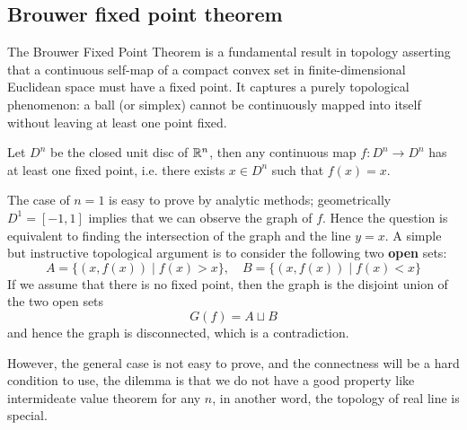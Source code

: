 \subsection{Brouwer fixed point theorem}
The Brouwer Fixed Point Theorem is a fundamental result in topology asserting that a continuous self-map of a compact convex set in finite-dimensional Euclidean space must have a fixed point.
It captures a purely topological phenomenon: a ball (or simplex) cannot be continuously mapped into itself without leaving at least one point fixed.
\begin{theorem}[Brouwer]
    Let \(D^n\) be the closed unit disc of \(\mathbb{R}^n\), then any continuous map \(f:D^n \to D^n\) has at least one fixed point, i.e. there exists \(x \in D^n\) such that \(f(x) = x\).
\end{theorem}
\begin{remark}
    The case of \(n=1\) is easy to prove by analytic methods; geometrically \(D^1 = [-1,1]\) implies that we can observe the graph of \(f\). Hence the question is equivalent to finding the intersection of the graph and the line \(y = x\). A simple but instructive topological argument is to consider the following two \textbf{open} sets:
    \[A = \{(x,f(x)) \mid f(x)>x\}, \quad B = \{(x,f(x)) \mid f(x)<x\}\]
    If we assume that there is no fixed point, then the graph is the disjoint union of the two open sets
    \[G(f) = A \sqcup B\]
    and hence the graph is disconnected, which is a contradiction.

    \begin{center}
    \end{center}

    However, the general case is not easy to prove, and the connectness will be a hard condition to use, the dilemma is that we do not have a good property like intermideate value theorem for any \(n\), in another word, the topology of real line is special.
\end{remark}

